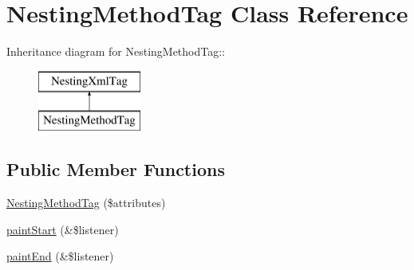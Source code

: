 \hypertarget{class_nesting_method_tag}{
\section{NestingMethodTag Class Reference}
\label{class_nesting_method_tag}
}
Inheritance diagram for NestingMethodTag::\begin{figure}[H]
\begin{center}
\leavevmode
\includegraphics[height=2cm]{class_nesting_method_tag}
\end{center}
\end{figure}
\subsection*{Public Member Functions}
\begin{DoxyCompactItemize}
\item 
\hyperlink{class_nesting_method_tag_a7f84bd600d310fea9b0ae676ba4f24d7}{NestingMethodTag} (\$attributes)
\item 
\hyperlink{class_nesting_method_tag_a9d29783caa420bbd786c51e1b400a481}{paintStart} (\&\$listener)
\item 
\hyperlink{class_nesting_method_tag_a15ed8db13ff62f4f3f7631212f1b6278}{paintEnd} (\&\$listener)
\end{DoxyCompactItemize}


